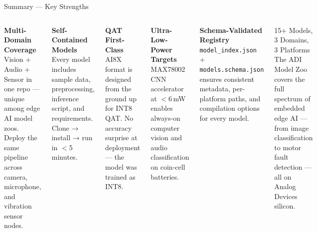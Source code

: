 \documentclass[aspectratio=169,10pt]{beamer}
\newcommand{\adi}[1]{\textcolor{ADIBlue}{\textbf{#1}}}
\begin{document}
\begin{frame}{Summary — Key Strengths}
  \begin{columns}[T]
    \begin{block}{\adi{Multi-Domain Coverage}}
      {\small Vision + Audio + Sensor in one repo — unique among edge AI model zoos. Deploy the same pipeline across camera, microphone, and vibration sensor nodes.}
    \end{block}
    \vspace{4pt}
    \begin{block}{\adi{Self-Contained Models}}
      {\small Every model includes sample data, preprocessing, inference script, and requirements. Clone → install → run in $<$5 minutes.}
    \end{block}
    \vspace{4pt}
    \begin{block}{\adi{QAT First-Class}}
      {\small AI8X format is designed from the ground up for INT8 QAT. No accuracy surprise at deployment — the model was trained as INT8.}
    \end{block}

    \begin{block}{\adi{Ultra-Low-Power Targets}}
      {\small MAX78002 CNN accelerator at $<$6\,mW enables always-on computer vision and audio classification on coin-cell batteries.}
    \end{block}
    \vspace{4pt}
    \begin{block}{\adi{Schema-Validated Registry}}
      {\small \texttt{model\_index.json} + \texttt{models.schema.json} ensures consistent metadata, per-platform paths, and compilation options for every model.}
    \end{block}
    \vspace{4pt}
    \begin{alertblock}{15+ Models, 3 Domains, 3 Platforms}
      {\small The ADI Model Zoo covers the full spectrum of embedded edge AI — from image classification to motor fault detection — all on Analog Devices silicon.}
    \end{alertblock}
  \end{columns}
\end{frame}
\end{document}

